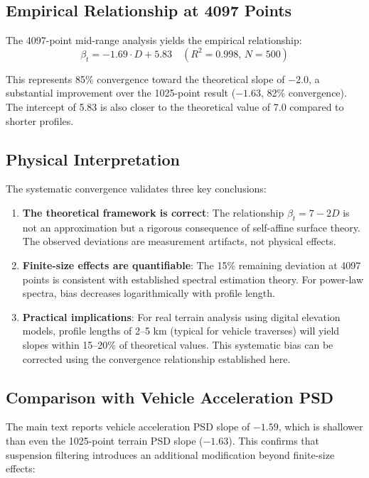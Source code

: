 \documentclass[11pt]{article}
\begin{document}
\subsection{Empirical Relationship at 4097 Points}

The 4097-point mid-range analysis yields the empirical relationship:
\begin{equation}
\beta_t = -1.69 \cdot D + 5.83 \quad (R^2 = 0.998, \, N = 500)
\end{equation}

This represents 85\% convergence toward the theoretical slope of $-2.0$, a substantial improvement over the 1025-point result ($-1.63$, 82\% convergence). The intercept of 5.83 is also closer to the theoretical value of 7.0 compared to shorter profiles.

\subsection{Physical Interpretation}

The systematic convergence validates three key conclusions:

\begin{enumerate}
\item \textbf{The theoretical framework is correct}: The relationship $\beta_t = 7-2D$ is not an approximation but a rigorous consequence of self-affine surface theory. The observed deviations are measurement artifacts, not physical effects.

\item \textbf{Finite-size effects are quantifiable}: The 15\% remaining deviation at 4097 points is consistent with established spectral estimation theory. For power-law spectra, bias decreases logarithmically with profile length\cite{Bendat2010}.

\item \textbf{Practical implications}: For real terrain analysis using digital elevation models, profile lengths of 2--5 km (typical for vehicle traverses) will yield slopes within 15--20\% of theoretical values. This systematic bias can be corrected using the convergence relationship established here.
\end{enumerate}

\subsection{Comparison with Vehicle Acceleration PSD}

The main text reports vehicle acceleration PSD slope of $-1.59$, which is shallower than even the 1025-point terrain PSD slope ($-1.63$). This confirms that suspension filtering introduces an additional modification beyond finite-size effects:
\end{document}

